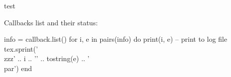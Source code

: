 \documentclass{article}
\begin{document}
\parindent0pt\thispagestyle{empty}
test

Callbacks list and their status:\par
\def\zzz#1#2{\hbox to12pc{\textbf{\detokenize{#1}}(#2)}}
\begin{luacode}
  info = callback.list()
  for i, e in pairs(info) do
    print(i, e) -- print to log file
    tex.sprint('\\zzz{' .. i .. '}{' .. tostring(e) .. '}\\par')
  end
\end{luacode}
\end{document}

